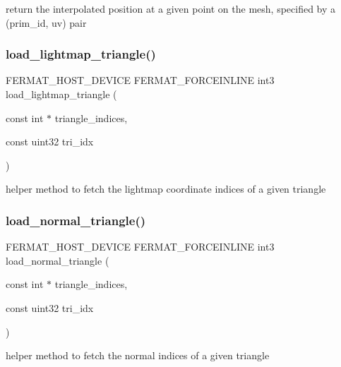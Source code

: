 return the interpolated position at a given point on the mesh, specified by a (prim\+\_\+id, uv) pair \mbox{\label{group___mesh_module_ga141eb095f266c67ca8005c9ec6f55815}} 
\subsubsection{\texorpdfstring{load\+\_\+lightmap\+\_\+triangle()}{load\_lightmap\_triangle()}}
{\footnotesize\ttfamily F\+E\+R\+M\+A\+T\+\_\+\+H\+O\+S\+T\+\_\+\+D\+E\+V\+I\+CE F\+E\+R\+M\+A\+T\+\_\+\+F\+O\+R\+C\+E\+I\+N\+L\+I\+NE int3 load\+\_\+lightmap\+\_\+triangle (\begin{DoxyParamCaption}\item[{const int $\ast$}]{triangle\+\_\+indices,  }\item[{const uint32}]{tri\+\_\+idx }\end{DoxyParamCaption})}

helper method to fetch the lightmap coordinate indices of a given triangle \mbox{\label{group___mesh_module_ga85e3684bd6c76144d9dc00a2b59cf93f}} 
\subsubsection{\texorpdfstring{load\+\_\+normal\+\_\+triangle()}{load\_normal\_triangle()}}
{\footnotesize\ttfamily F\+E\+R\+M\+A\+T\+\_\+\+H\+O\+S\+T\+\_\+\+D\+E\+V\+I\+CE F\+E\+R\+M\+A\+T\+\_\+\+F\+O\+R\+C\+E\+I\+N\+L\+I\+NE int3 load\+\_\+normal\+\_\+triangle (\begin{DoxyParamCaption}\item[{const int $\ast$}]{triangle\+\_\+indices,  }\item[{const uint32}]{tri\+\_\+idx }\end{DoxyParamCaption})}

helper method to fetch the normal indices of a given triangle \mbox{\label{group___mesh_module_ga347e9722a85a86f87f7d31a63f333dd5}} 
